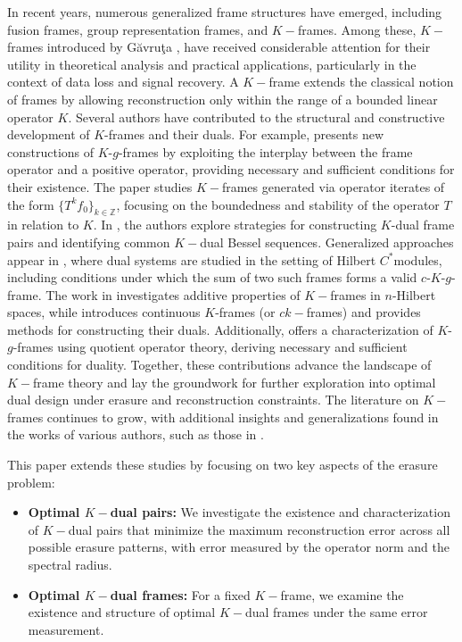 \documentclass[final,1p,times]{elsarticle}
\begin{document}
In recent years, numerous generalized frame structures have emerged, including fusion frames, group representation frames, and \(K-\)frames. Among these, \(K-\)frames introduced by G\u{a}vru\c{t}a \cite{gua}, have received considerable attention for their utility in theoretical analysis and practical applications, particularly in the context of data loss and signal recovery. A \(K-\)frame extends the classical notion of frames by allowing reconstruction only within the range of a bounded linear operator \(K\). Several authors have contributed to the structural and constructive development of \(K\)-frames and their duals. For example, \cite{du} presents new constructions of \(K\)-\(g\)-frames by exploiting the interplay between the frame operator and a positive operator, providing necessary and sufficient conditions for their existence. The paper \cite{he} studies \(K-\)frames generated via operator iterates of the form \(\{T^k f_0\}_{k \in \mathbb{Z}}\), focusing on the boundedness and stability of the operator \(T\) in relation to \(K\). In \cite{li4}, the authors explore strategies for constructing \(K\)-dual frame pairs and identifying common \(K-\)dual Bessel sequences. Generalized approaches appear in \cite{bar}, where dual systems are studied in the setting of Hilbert \(C^*\)modules, including conditions under which the sum of two such frames forms a valid \(c\)-\(K\)-\(g\)-frame. The work in \cite{wang} investigates additive properties of \(K-\)frames in \(n\)-Hilbert spaces, while \cite{nami} introduces continuous \(K\)-frames (or \(ck-\)frames) and provides methods for constructing their duals. Additionally, \cite{li3} offers a characterization of \(K\)-\(g\)-frames using quotient operator theory, deriving necessary and sufficient conditions for duality. Together, these contributions advance the landscape of \(K-\)frame theory and lay the groundwork for further exploration into optimal dual design under erasure and reconstruction constraints. The literature on $K-$frames continues to grow, with additional insights and generalizations found in the works of various authors, such as those in \cite{pill,xiao,koba}.




This paper extends these studies by focusing on two key aspects of the erasure problem:
\begin{itemize}
	\item \textbf{Optimal $K-$dual pairs:} We investigate the existence and characterization of $K-$dual pairs that minimize the maximum reconstruction error across all possible erasure patterns, with error measured by the operator norm and the spectral radius.
	
	\item \textbf{Optimal $K-$dual frames:} For a fixed $K-$frame, we examine the existence and structure of optimal $K-$dual frames under the same error measurement.
\end{itemize}
\end{document}
